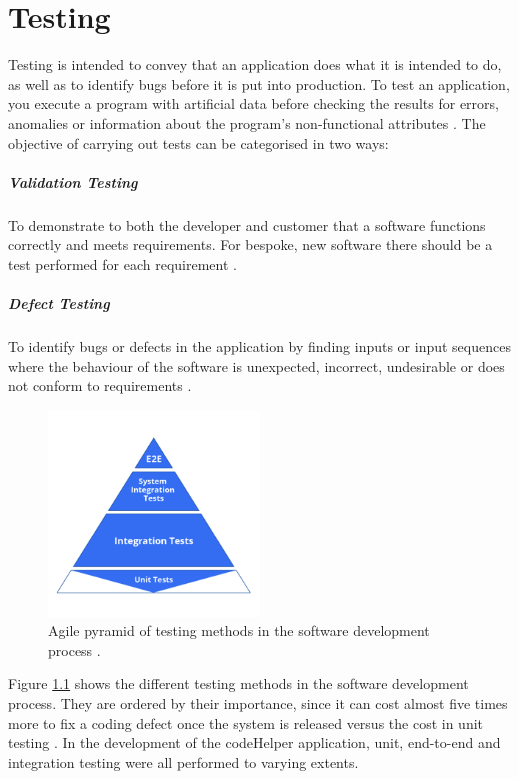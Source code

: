 \chapter{Testing}

Testing is intended to convey that an application does what it is intended to do, as well as to identify bugs before it is put into production. To test an application, you execute a program with artificial data before checking the results for errors, anomalies or information about the program's non-functional attributes \cite{sommerville}. The objective of carrying out tests can be categorised in two ways:

\paragraph{Validation Testing} To demonstrate to both the developer and customer that a software functions correctly and meets requirements. For bespoke, new software there should be a test performed for each requirement \cite{sommerville}.

\paragraph{Defect Testing} To identify bugs or defects in the application by finding inputs or input sequences where the behaviour of the software is unexpected, incorrect, undesirable or does not conform to requirements \cite{sommerville}. 

\begin{figure}[H]
    \centering
    \includegraphics[width=0.5\textwidth]{9testing/images/testingDiagram.png}
    \caption{Agile pyramid of testing methods in the software development process \cite{pyramid2}.}
    \label{fig:testing}
\end{figure}

Figure \ref{fig:testing} shows the different testing methods in the software development process. They are ordered by their importance, since it can cost almost five times more to fix a coding defect once the system is released versus the cost in unit testing \cite{pyramid}. In the development of the codeHelper application, unit, end-to-end and integration testing were all performed to varying extents.

